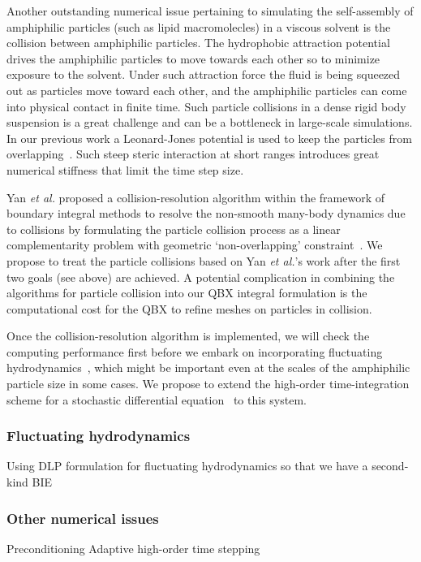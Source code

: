 Another outstanding numerical issue pertaining to simulating the
self-assembly of amphiphilic particles (such as lipid macromolecles) in
a viscous solvent is the collision between amphiphilic particles. The
hydrophobic attraction potential drives the amphiphilic particles to
move towards each other so to minimize exposure to the solvent. Under
such attraction force the fluid is being squeezed out as particles move
toward each other, and the amphiphilic particles can come into physical
contact in finite time. Such particle collisions in a dense rigid body
suspension is a great challenge and can be a bottleneck in large-scale
simulations. In our previous work a Leonard-Jones potential is used to
keep the particles from overlapping~\cite{Fu2018_SIAM}. Such steep
steric interaction at short ranges introduces great numerical stiffness
that limit the time step size. 

Yan {\it et al.} proposed a collision-resolution algorithm within the
framework of boundary integral methods to resolve the non-smooth
many-body dynamics due to collisions by formulating the particle
collision process as a linear complementarity problem with geometric
`non-overlapping' constraint~\cite{Yan2019}. We propose to treat the
particle collisions based on Yan {\it et al.}'s work after the first two
goals (see above) are achieved. A potential complication in combining
the algorithms for particle collision into our QBX integral formulation
is the computational cost for the QBX to refine meshes on particles in
collision.

Once the collision-resolution algorithm is implemented, we will check
the computing performance first before we embark on incorporating
fluctuating hydrodynamics~\cite{Bao17,Bao18}, which might be important
even at the scales of the amphiphilic particle size in some cases. We
propose to extend the high-order time-integration scheme for a
stochastic differential equation~\cite{fu2015pre} to this system.


\subsubsection{Fluctuating hydrodynamics}
Using DLP formulation for fluctuating hydrodynamics so that we have a
second-kind BIE

\subsubsection{Other numerical issues}
\label{subsec:NumericalIssues}
Preconditioning
Adaptive high-order time stepping


